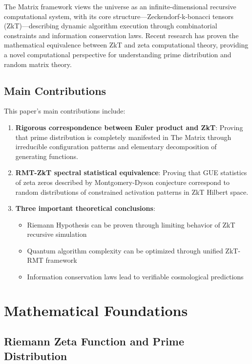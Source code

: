 \documentclass[12pt]{article}
\theoremstyle{plain}
\theoremstyle{definition}
\begin{document}
The Matrix framework views the universe as an infinite-dimensional recursive computational system, with its core structure—Zeckendorf-k-bonacci tensors (ZkT)—describing dynamic algorithm execution through combinatorial constraints and information conservation laws. Recent research has proven the mathematical equivalence between ZkT and zeta computational theory, providing a novel computational perspective for understanding prime distribution and random matrix theory.

\subsection{Main Contributions}

This paper's main contributions include:

\begin{enumerate}
\item \textbf{Rigorous correspondence between Euler product and ZkT}: Proving that prime distribution is completely manifested in The Matrix through irreducible configuration patterns and elementary decomposition of generating functions.

\item \textbf{RMT-ZkT spectral statistical equivalence}: Proving that GUE statistics of zeta zeros described by Montgomery-Dyson conjecture correspond to random distributions of constrained activation patterns in ZkT Hilbert space.

\item \textbf{Three important theoretical conclusions}:
\begin{itemize}
\item Riemann Hypothesis can be proven through limiting behavior of ZkT recursive simulation
\item Quantum algorithm complexity can be optimized through unified ZkT-RMT framework
\item Information conservation laws lead to verifiable cosmological predictions
\end{itemize}
\end{enumerate}

\section{Mathematical Foundations}

\subsection{Riemann Zeta Function and Prime Distribution}
\end{document}
